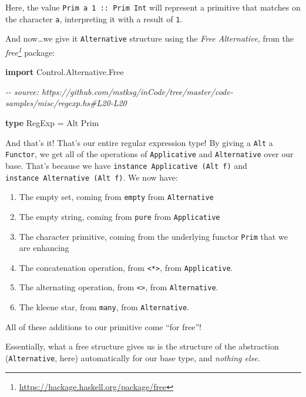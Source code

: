 \documentclass[]{article}
\newenvironment{Shaded}{}{}
\newcommand{\CommentTok}[1]{\textcolor[rgb]{0.38,0.63,0.69}{\textit{#1}}}
\newcommand{\DataTypeTok}[1]{\textcolor[rgb]{0.56,0.13,0.00}{#1}}
\newcommand{\KeywordTok}[1]{\textcolor[rgb]{0.00,0.44,0.13}{\textbf{#1}}}
\newcommand{\OtherTok}[1]{\textcolor[rgb]{0.00,0.44,0.13}{#1}}
\renewcommand{\href}[2]{#2\footnote{\url{#1}}}
\begin{document}
Here, the value
\texttt{Prim\ \textquotesingle{}a\textquotesingle{}\ 1\ ::\ Prim\ Int} will
represent a primitive that matches on the character \texttt{a}, interpreting it
with a result of \texttt{1}.

And now\ldots we give it \texttt{Alternative} structure using the \emph{Free
Alternative}, from the
\emph{\href{https://hackage.haskell.org/package/free}{free}} package:

\begin{Shaded}
\begin{Highlighting}[]
\KeywordTok{import} \DataTypeTok{Control.Alternative.Free}

\CommentTok{{-}{-} source: https://github.com/mstksg/inCode/tree/master/code{-}samples/misc/regexp.hs\#L20{-}L20}

\KeywordTok{type} \DataTypeTok{RegExp} \OtherTok{=} \DataTypeTok{Alt} \DataTypeTok{Prim}
\end{Highlighting}
\end{Shaded}

And that's it! That's our entire regular expression type! By giving a
\texttt{Alt} a \texttt{Functor}, we get all of the operations of
\texttt{Applicative} and \texttt{Alternative} over our base. That's because we
have \texttt{instance\ Applicative\ (Alt\ f)} and
\texttt{instance\ Alternative\ (Alt\ f)}. We now have:

\begin{enumerate}
\def\labelenumi{\arabic{enumi}.}
\tightlist
\item
  The empty set, coming from \texttt{empty} from \texttt{Alternative}
\item
  The empty string, coming from \texttt{pure} from \texttt{Applicative}
\item
  The character primitive, coming from the underlying functor \texttt{Prim} that
  we are enhancing
\item
  The concatenation operation, from \texttt{\textless{}*\textgreater{}}, from
  \texttt{Applicative}.
\item
  The alternating operation, from \texttt{\textless{}\textbar{}\textgreater{}},
  from \texttt{Alternative}.
\item
  The kleene star, from \texttt{many}, from \texttt{Alternative}.
\end{enumerate}

All of these additions to our primitive come ``for free''!

Essentially, what a free structure gives us is the structure of the abstraction
(\texttt{Alternative}, here) automatically for our base type, and \emph{nothing
else}.
\end{document}
